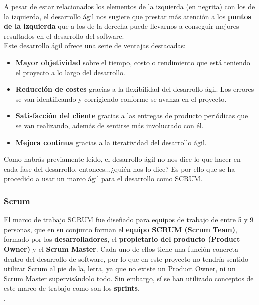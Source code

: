 A pesar de estar relacionados los elementos de la izquierda (en negrita) con los de la
izquierda, el desarrollo ágil nos sugiere que prestar más atención a los \textbf{puntos
de la izquierda} que a los de la derecha puede llevarnos a conseguir mejores resultados
en el desarrollo del software.\\

Este desarrollo ágil ofrece una serie de ventajas \cite{advantages-agile-methodology}
destacadas:

    \begin{itemize}
        \item \textbf{Mayor objetividad} sobre el tiempo, costo o rendimiento que está
        teniendo el proyecto a lo largo del desarrollo.
        \item \textbf{Reducción de costes} gracias a la flexibilidad del desarrollo ágil.
        Los errores se van identificando y corrigiendo conforme se avanza en el proyecto.
        \item \textbf{Satisfacción del cliente} gracias a las entregas de producto
        periódicas que se van realizando, además de sentirse más involucrado con él.
        \item \textbf{Mejora continua} gracias a la iteratividad del desarrollo ágil. 
    \end{itemize}

Como habrás previamente leído, el desarrollo ágil no nos dice lo que hacer en cada fase
del desarrollo, entonces...¿quién nos lo dice? Es por ello que se ha procedido a usar un
marco ágil para el desarrollo como SCRUM.\\

\subsubsection{Scrum} \label{subsubsec:scrum}
El marco de trabajo SCRUM \cite{scrum} fue diseñado para equipos de trabajo de entre 5 y 9
personas, que en su conjunto forman el \textbf{equipo SCRUM (Scrum Team)}, formado por los
\textbf{desarrolladores}, el \textbf{propietario del producto (Product Owner)} y el
\textbf{Scrum Master}. Cada uno de ellos tiene una función concreta dentro del desarrollo
de software, por lo que en este proyecto no tendría sentido utilizar Scrum al pie de la,
letra, ya que no existe un Product Owner, ni un Scrum Master supervisándolo todo. Sin
embargo, sí se han utilizado conceptos de este marco de trabajo como son los 
\textbf{sprints}.\\.

